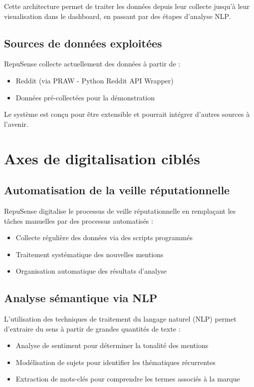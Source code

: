 \documentclass[12pt,a4paper]{report}
\begin{document}
Cette architecture permet de traiter les données depuis leur collecte jusqu'à leur visualisation dans le dashboard, en passant par des étapes d'analyse NLP.

\section{Sources de données exploitées}
RepuSense collecte actuellement des données à partir de :
\begin{itemize}
    \item Reddit (via PRAW - Python Reddit API Wrapper)
    \item Données pré-collectées pour la démonstration
\end{itemize}

Le système est conçu pour être extensible et pourrait intégrer d'autres sources à l'avenir.

\chapter{Axes de digitalisation ciblés}

\section{Automatisation de la veille réputationnelle}
RepuSense digitalise le processus de veille réputationnelle en remplaçant les tâches manuelles par des processus automatisés :
\begin{itemize}
    \item Collecte régulière des données via des scripts programmés
    \item Traitement systématique des nouvelles mentions
    \item Organisation automatique des résultats d'analyse
\end{itemize}

\section{Analyse sémantique via NLP}
L'utilisation des techniques de traitement du langage naturel (NLP) permet d'extraire du sens à partir de grandes quantités de texte :
\begin{itemize}
    \item Analyse de sentiment pour déterminer la tonalité des mentions
    \item Modélisation de sujets pour identifier les thématiques récurrentes
    \item Extraction de mots-clés pour comprendre les termes associés à la marque
\end{itemize}
\end{document}
